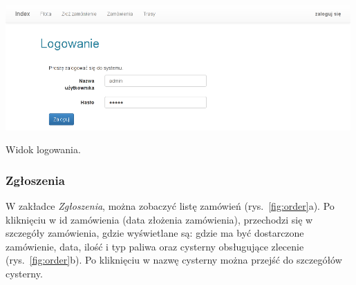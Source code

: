 \documentclass[11pt,a4paper,oneside]{mwart}
\begin{document}
\begin{wykres}[htbp]
  \centering
  \includegraphics[width=0.99\textwidth]{pics/login.png}
  \caption{Widok logowania.}
  \label{fig:login}
\end{wykres}


\subsubsection{Zgłoszenia}
W zakładce \emph{Zgłoszenia}, można zobaczyć listę zamówień (rys.~\ref{fig:order}a). Po kliknięciu w id zamówienia (data złożenia zamówienia), przechodzi się w szczegóły zamówienia, gdzie wyświetlane są: gdzie ma być dostarczone zamówienie, data, ilość i typ paliwa oraz cysterny obsługujące zlecenie (rys.~\ref{fig:order}b). Po kliknięciu w nazwę cysterny można przejść do szczegółów cysterny.
\end{document}
